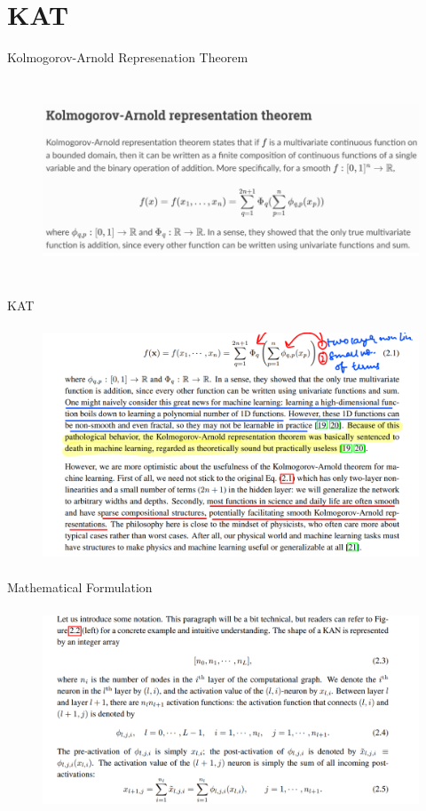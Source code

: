 \documentclass[serif, aspectratio=169]{beamer}
\begin{document}
\section{KAT}
\begin{frame}{Kolmogorov-Arnold Represenation Theorem}
    \begin{figure}
        \centering
        \includegraphics[height=6cm]{no3.png}
    \end{figure}
\end{frame}
\begin{frame}{KAT}
    \begin{figure}
        \centering
        \includegraphics[height=7cm]{image copy 10.png}
    \end{figure}
\end{frame}
\begin{frame}{Mathematical Formulation}
    \begin{figure}
        \centering
        \includegraphics[height=6cm]{image copy 11.png}
    \end{figure}
\end{frame}
\end{document}
